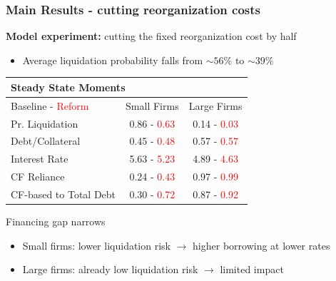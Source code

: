 \documentclass[aspectratio=169,xcolor=table]{beamer}
\begin{document}
\begin{frame}[label = Main Results 1]  \frametitle{Main Results - cutting reorganization costs}

\textbf{Model experiment:} cutting the fixed reorganization cost by half
\begin{itemize} \small
    \item Average liquidation probability falls from $\sim 56\%$ to $\sim 39\%$
\end{itemize} 

\footnotesize
\begin{table}[h!]
    \centering
    \renewcommand{\arraystretch}{0.85}
    \begin{tabular}{l|c|c}
    \multicolumn{3}{l}{\textbf{Steady State Moments}} \\ 
    \toprule
     Baseline - \textcolor{red}{Reform} & Small Firms & Large Firms \\
    \midrule
    Pr. Liquidation & 0.86 - \textcolor{red}{0.63} & 0.14 - \textcolor{red}{0.03} \\ 
    Debt/Collateral & 0.45 - \textcolor{red}{0.48} & 0.57 - \textcolor{red}{0.57} \\ 
    Interest Rate & 5.63 - \textcolor{red}{5.23} & 4.89 - \textcolor{red}{4.63} \\  
    CF Reliance & 0.24 - \textcolor{red}{0.43} & 0.97 - \textcolor{red}{0.99} \\ 
    CF-based to Total Debt & 0.30 - \textcolor{red}{0.72} & 0.87 - \textcolor{red}{0.92} \\ 
    \bottomrule
    \end{tabular}
    \label{tab:SSvalues_compact}
\end{table} \normalsize

Financing gap narrows
\begin{itemize} \small
    \item Small firms: lower liquidation risk $\rightarrow$ higher borrowing at lower rates
    \item Large firms: already low liquidation risk $\rightarrow$ limited impact
\end{itemize} 


\end{frame}
\end{document}

